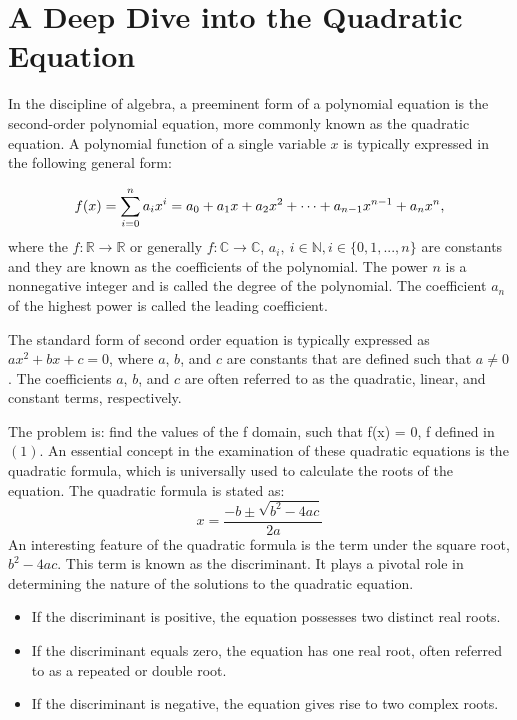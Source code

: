 \documentclass[12pt]{book}
\begin{document}
\section{A Deep Dive into the Quadratic Equation}

In the discipline of algebra, a preeminent form of a polynomial equation is the second-order polynomial equation, more commonly known as the quadratic equation. A polynomial function of a single variable $x$ is typically expressed in the following general form:

\begin{equation}
f(x) = \sum_{i=0}^{n} a_ix^i = a_0 + a_1x + a_2x^2 + \cdots + a_{n-1}x^{n-1} + a_nx^n \\,
\end{equation}
where the $f: \mathbb{R} \rightarrow \mathbb{R}$ or generally $f: \mathbb{C} \rightarrow \mathbb{C}$, $a_i, \ i \in \mathbb{N}, i \in \{0, 1, ..., n \}$ are constants and they are known as the coefficients of the polynomial. The power $n$ is a nonnegative integer and is called the degree of the polynomial. The coefficient $a_n$ of the highest power is called the leading coefficient.

 The standard form of second order equation is typically expressed as $ax^2 + bx + c = 0$, where $a$, $b$, and $c$ are constants that are defined such that $a \neq 0$. The coefficients $a$, $b$, and $c$ are often referred to as the quadratic, linear, and constant terms, respectively. 

The problem is: find the values of the f domain, such that f(x) = 0, f defined in $(1)$. An essential concept in the examination of these quadratic equations is the quadratic formula, which is universally used to calculate the roots of the equation. The quadratic formula is stated as:
\begin{equation}
x = \frac{-b \pm \sqrt{b^2 - 4ac}}{2a}
\end{equation}
An interesting feature of the quadratic formula is the term under the square root, $b^2 - 4ac$. This term is known as the discriminant. It plays a pivotal role in determining the nature of the solutions to the quadratic equation.

\begin{itemize}
    \item If the discriminant is positive, the equation possesses two distinct real roots.
    \item If the discriminant equals zero, the equation has one real root, often referred to as a repeated or double root.
    \item If the discriminant is negative, the equation gives rise to two complex roots.
\end{itemize}
\end{document}
